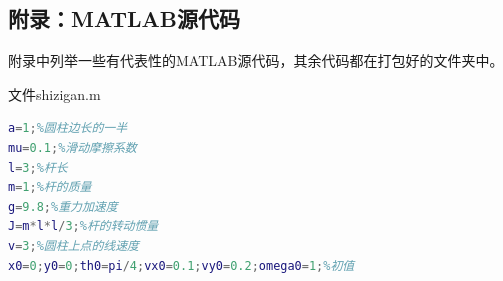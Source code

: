 \documentclass[UTF8,a4paper,12pt,twocolumn]{ctexart}
\begin{document}
\begin{onecolumn}
\section*{附录：MATLAB源代码}
附录中列举一些有代表性的MATLAB源代码，其余代码都在打包好的文件夹中。

文件shizigan.m
\begin{lstlisting}[language={Matlab},morekeywords={dsolve}]
a=1;%圆柱边长的一半
mu=0.1;%滑动摩擦系数
l=3;%杆长
m=1;%杆的质量
g=9.8;%重力加速度
J=m*l*l/3;%杆的转动惯量
v=3;%圆柱上点的线速度
x0=0;y0=0;th0=pi/4;vx0=0.1;vy0=0.2;omega0=1;%初值
\end{lstlisting}

%

\end{onecolumn}
\end{document}
